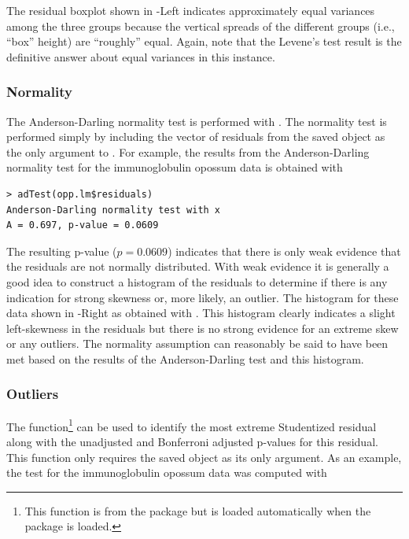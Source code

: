 \documentclass[10pt,openany]{book}\usepackage[]{graphicx}\usepackage[]{color}
\makeatletter
\newenvironment{kframe}{%
 \def\at@end@of@kframe{}%
 \ifinner\ifhmode%
  \def\at@end@of@kframe{\end{minipage}}%
  \begin{minipage}{\columnwidth}%
 \fi\fi%
 \def\FrameCommand##1{\hskip\@totalleftmargin \hskip-\fboxsep
 \colorbox{shadecolor}{##1}\hskip-\fboxsep
     \hskip-\linewidth \hskip-\@totalleftmargin \hskip\columnwidth}%
 \MakeFramed {\advance\hsize-\width
   \@totalleftmargin\z@ \linewidth\hsize
   \@setminipage}}%
 {\par\unskip\endMakeFramed%
 \at@end@of@kframe}
\newenvironment{knitrout}{}{} %
\makeatother
\begin{document}
The residual boxplot shown in -Left indicates approximately equal variances among the three groups because the vertical spreads of the different groups (i.e., ``box'' height) are ``roughly'' equal.  Again, note that the Levene's test result is the definitive answer about equal variances in this instance.

\subsubsection*{Normality}
The Anderson-Darling normality test is performed with .  The normality test is performed simply by including the vector of residuals from the saved  object as the only argument to .  For example, the results from the Anderson-Darling normality test for the immunoglobulin opossum data is obtained with

\begin{knitrout}
\color{fgcolor}\begin{kframe}
\begin{verbatim}
> adTest(opp.lm$residuals)
Anderson-Darling normality test with x 
A = 0.697, p-value = 0.0609
\end{verbatim}
\end{kframe}
\end{knitrout}

The resulting p-value ($p=0.0609$) indicates that there is only weak evidence that the residuals are not normally distributed.  With weak evidence it is generally a good idea to construct a histogram of the residuals to determine if there is any indication for strong skewness or, more likely, an outlier.  The histogram for these data shown in -Right as obtained with .  This histogram clearly indicates a slight left-skewness in the residuals but there is no strong evidence for an extreme skew or any outliers.  The normality assumption can reasonably be said to have been met based on the results of the Anderson-Darling test and this histogram.

\subsubsection*{Outliers}
The  function\footnote{This function is from the  package but is loaded automatically when the  package is loaded.} can be used to identify the most extreme Studentized residual along with the unadjusted and Bonferroni adjusted p-values for this residual.  This function only requires the saved  object as its only argument.  As an example, the test for the immunoglobulin opossum data was computed with
\end{document}
